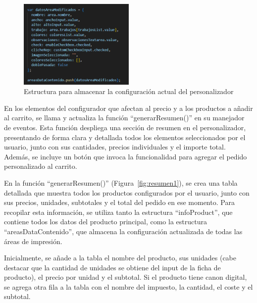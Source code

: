 \documentclass[12pt]{article}
\begin{document}
\begin{figure}[ht]
    \centering
    \includegraphics[width=0.5\textwidth]{imagenesUS3-modal/variableDatosArreglada.png}
    \caption{\label{fig:variableConfiguracion} Estructura para almacenar la configuración actual del personalizador}
    \vspace{\fill}
\end{figure}

En los elementos del configurador que afectan al precio y a los productos a añadir al carrito, se llama y actualiza la función ``generarResumen()'' 
en su manejador de eventos. Esta función despliega una sección de resumen en el personalizador, presentando de forma clara y detallada todos 
los elementos seleccionados por el usuario, junto con sus cantidades, precios individuales y el importe total. Además, 
se incluye un botón que invoca la funcionalidad para agregar el pedido personalizado al carrito.


En la función ``generarResumen()'' (Figura~\ref{fig:resumen1}), se crea una tabla detallada que muestra todos los productos configurados por el usuario, junto con sus precios,
unidades, subtotales y el total del pedido en ese momento. Para recopilar esta información, se utiliza tanto la estructura ``infoProduct'', 
que contiene todos los datos del producto principal, como la estructura ``areasDataContenido'', que almacena la configuración actualizada 
de todas las áreas de impresión.

Inicialmente, se añade a la tabla el nombre del producto, sus unidades (cabe destacar que la cantidad de unidades se obtiene del input de 
la ficha de producto), el precio por unidad y el subtotal. Si el producto tiene canon digital, 
se agrega otra fila a la tabla con el nombre del impuesto, la cantidad, el coste y el subtotal.
\end{document}
